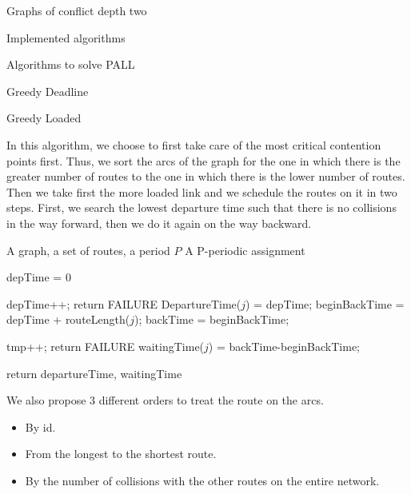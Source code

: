 \documentclass[10pt]{article}
\begin{document}
\begin{section}{Graphs of conflict depth two}
\begin{subsection}{Implemented algorithms}
\begin{subsubsection}{Algorithms to solve PALL}
\begin{paragraph}{Greedy Deadline}
        \end{paragraph}
    \begin{paragraph}{Greedy Loaded}

In this algorithm, we choose to first take care of the most critical contention points first. Thus, we sort the arcs of the graph for the one in which there is the greater number of routes to the one in which there is the lower number of routes. Then we take first the more loaded link and we schedule the routes on it in two steps.
First, we search the lowest departure time such that there is no collisions in the way forward, then we do it again on the way backward. 

   	\begin{algorithm}[H]
 	\caption{Greedy Loaded}
 	\begin{algorithmic}
 	\REQUIRE A graph, a set of routes, a period $P$
	\ENSURE A P-periodic assignment

	
	\STATE depTime = $0$
	
 	
 	\STATE depTime++;
	\STATE return FAILURE
	\ENDIF
 	\ENDWHILE
	\STATE DepartureTime($j$) = depTime;
	\STATE beginBackTime = depTime + routeLength($j$);
	\STATE backTime = beginBackTime;
	
 	
 	\STATE tmp++;
	\STATE return FAILURE
	\ENDIF
 	\ENDWHILE
	\STATE waitingTime($j$) = backTime-beginBackTime;
	\ENDIF
 	\ENDFOR

 	\ENDFOR
	\STATE return departureTime, waitingTime

 	\end{algorithmic}
 	\end{algorithm}
We also propose $3$ different orders to treat the route on the arcs. 
\begin{itemize}
\item By id.
\item From the longest to the shortest route.
\item By the number of collisions with the other routes on the entire network.
\end{itemize}
    \end{paragraph}
  \end{subsubsection}
\end{subsection}
\end{section}
	 



\end{document}
